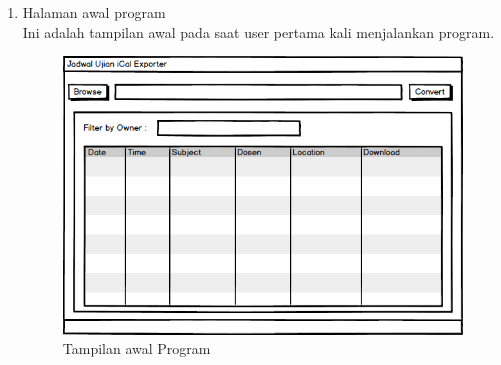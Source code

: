 \begin{enumerate}
	\item Halaman awal program\\
	Ini adalah tampilan awal pada saat user pertama kali menjalankan program.		
	\begin{figure}[H]
		\centering
		\includegraphics[scale=0.5]{Gambar/antarmuka}
		\caption{Tampilan awal Program}
		\label{fig:tampilan_awal}
		\end{figure}
		

\end{enumerate}
